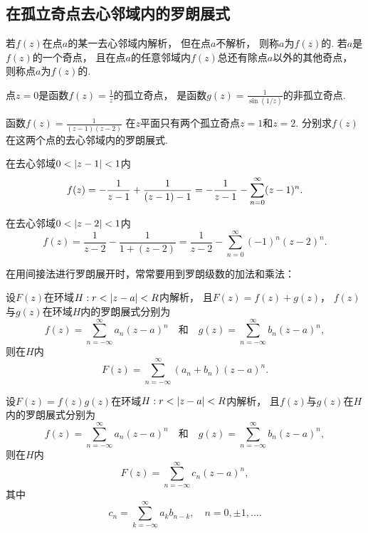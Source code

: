 \subsection{在孤立奇点去心邻域内的罗朗展式}
\begin{definition}
若\(f(z)\)在点\(a\)的某一去心邻域内解析，
但在点\(a\)不解析，
则称\(a\)为\(f(z)\)的.
若\(a\)是\(f(z)\)的一个奇点，
且在点\(a\)的任意邻域内\(f(z)\)总还有除点\(a\)以外的其他奇点，
则称点\(a\)为\(f(z)\)的.
\end{definition}

\begin{example}
点\(z=0\)是函数\(f(z) = \frac{1}{z}\)的孤立奇点，
是函数\(g(z) = \frac{1}{\sin(1/z)}\)的非孤立奇点.
\end{example}

\begin{example}
函数\(f(z) = \frac{1}{(z-1)(z-2)}\)
在\(z\)平面只有两个孤立奇点\(z=1\)和\(z=2\).
分别求\(f(z)\)在这两个点的去心邻域内的罗朗展式.
\begin{solution}
在去心邻域\(0<\abs{z-1}<1\)内\[
	f(z) = -\frac{1}{z-1} + \frac{1}{(z-1)-1} \\
	= -\frac{1}{z-1} - \sum_{n=0}^\infty (z-1)^n.
\]

在去心邻域\(0<\abs{z-2}<1\)内\[
	f(z) = \frac{1}{z-2} - \frac{1}{1+(z-2)}
	= \frac{1}{z-2} - \sum_{n=0}^\infty (-1)^n (z-2)^n.
\]
\end{solution}
\end{example}

在用间接法进行罗朗展开时，常常要用到罗朗级数的加法和乘法：
\begin{theorem}[罗朗级数的加法]
设\(F(z)\)在环域\(H: r < \abs{z-a} < R\)内解析，
且\(F(z) = f(z) + g(z)\)，
\(f(z)\)与\(g(z)\)在环域\(H\)内的罗朗展式分别为\[
	f(z) = \sum_{n=-\infty}^\infty a_n (z-a)^n
	\quad\text{和}\quad
	g(z) = \sum_{n=-\infty}^\infty b_n (z-a)^n,
\]
则在\(H\)内\[
	F(z) = \sum_{n=-\infty}^\infty (a_n+b_n) (z-a)^n.
\]
\end{theorem}

\begin{theorem}[罗朗级数的乘法]
设\(F(z) = f(z) g(z)\)在环域\(H: r < \abs{z-a} < R\)内解析，
且\(f(z)\)与\(g(z)\)在\(H\)内的罗朗展式分别为\[
	f(z) = \sum_{n=-\infty}^\infty a_n (z-a)^n
	\quad\text{和}\quad
	g(z) = \sum_{n=-\infty}^\infty b_n (z-a)^n,
\]
则在\(H\)内\[
	F(z) = \sum_{n=-\infty}^\infty c_n (z-a)^n,
\]
其中\[
	c_n = \sum_{k=-\infty}^\infty a_k b_{n-k},
	\quad n=0,\pm1,\dotsc.
\]
\end{theorem}

